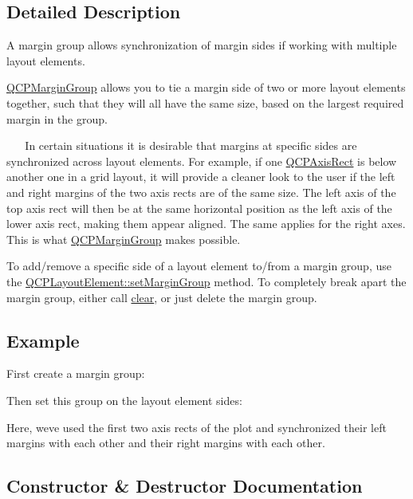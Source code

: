 \subsection{Detailed Description}
A margin group allows synchronization of margin sides if working with multiple layout elements. 

\hyperlink{class_q_c_p_margin_group}{Q\+C\+P\+Margin\+Group} allows you to tie a margin side of two or more layout elements together, such that they will all have the same size, based on the largest required margin in the group.

~\newline
~\newline
 In certain situations it is desirable that margins at specific sides are synchronized across layout elements. For example, if one \hyperlink{class_q_c_p_axis_rect}{Q\+C\+P\+Axis\+Rect} is below another one in a grid layout, it will provide a cleaner look to the user if the left and right margins of the two axis rects are of the same size. The left axis of the top axis rect will then be at the same horizontal position as the left axis of the lower axis rect, making them appear aligned. The same applies for the right axes. This is what \hyperlink{class_q_c_p_margin_group}{Q\+C\+P\+Margin\+Group} makes possible.

To add/remove a specific side of a layout element to/from a margin group, use the \hyperlink{class_q_c_p_layout_element_a516e56f76b6bc100e8e71d329866847d}{Q\+C\+P\+Layout\+Element\+::set\+Margin\+Group} method. To completely break apart the margin group, either call \hyperlink{class_q_c_p_margin_group_a144b67f216e4e86c3a3a309e850285fe}{clear}, or just delete the margin group.\hypertarget{class_q_c_p_margin_group_QCPMarginGroup-example}{}\subsection{Example}\label{class_q_c_p_margin_group_QCPMarginGroup-example}
First create a margin group\+: 
\begin{DoxyCodeInclude}
\end{DoxyCodeInclude}
Then set this group on the layout element sides\+: 
\begin{DoxyCodeInclude}
\end{DoxyCodeInclude}
Here, we\textquotesingle{}ve used the first two axis rects of the plot and synchronized their left margins with each other and their right margins with each other. 

\subsection{Constructor \& Destructor Documentation}
\mbox{\label{class_q_c_p_margin_group_ac481c20678ec5b305d6df330715f4b7b}} 

